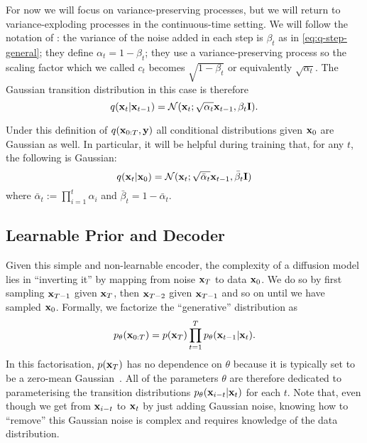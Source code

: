 For now we will focus on variance-preserving processes, but we will return to variance-exploding processes in the continuous-time setting. We will follow the notation of \citet{nichol2021improved}: the variance of the noise added in each step is $\beta_t$ as in \cref{eq:q-step-general}; they define $\alpha_t = 1-\beta_t$; they use a variance-preserving process so the scaling factor which we called $c_t$ becomes $\sqrt{1-\beta_t}$ or equivalently $\sqrt{\alpha_t}$. The Gaussian transition distribution in this case is therefore
\begin{equation} \label{eq:q-step-iddpm}
    q({\mathbf{x}}_t | {\mathbf{x}}_{t-1}) = {\mathcal{N}}({\mathbf{x}}_t ; \sqrt{\alpha_t}  {\mathbf{x}}_{t-1} , \beta_t {\mathbf{I}} ).
\end{equation}

Under this definition of $q({\mathbf{x}}_{0:T}, {\mathbf{y}})$ all conditional distributions given ${\mathbf{x}}_0$ are Gaussian as well. In particular, it will be helpful during training that, for any $t$, the following is Gaussian: 
\begin{equation} \label{eq:q-step-iddpm}
    q({\mathbf{x}}_t | {\mathbf{x}}_0) = {\mathcal{N}}({\mathbf{x}}_t ; \sqrt{\bar{\alpha}_t}  {\mathbf{x}}_{t-1} , \bar{\beta}_t {\mathbf{I}} )
\end{equation}
where $\bar{\alpha}_t := \prod_{i=1}^t \alpha_i$ and $\bar{\beta}_t = 1 - \bar{\alpha}_t$.

\subsection{Learnable Prior and Decoder}
Given this simple and non-learnable encoder, the complexity of a diffusion model lies in ``inverting it'' by mapping from noise ${\mathbf{x}}_T$ to data ${\mathbf{x}}_0$. We do so by first sampling ${\mathbf{x}}_{T-1}$ given ${\mathbf{x}}_T$, then ${\mathbf{x}}_{T-2}$ given ${\mathbf{x}}_{T-1}$ and so on until we have sampled ${\mathbf{x}}_0$. Formally, we factorize the ``generative'' distribution as
\begin{equation}
    p_\theta({\mathbf{x}}_{0:T}) = p({\mathbf{x}}_T) \prod_{t=1}^T p_\theta({\mathbf{x}}_{t-1}|{\mathbf{x}}_t).
\end{equation}
In this factorisation, $p({\mathbf{x}}_T)$ has no dependence on $\theta$ because it is typically set to be a zero-mean Gaussian~\citep{ho2020denoising}. All of the parameters $\theta$ are therefore dedicated to parameterising the transition distributions $p_\theta({\mathbf{x}}_{i-t}|{\mathbf{x}}_t)$ for each $t$. Note that, even though we get from ${\mathbf{x}}_{i-t}$ to ${\mathbf{x}}_t$ by just adding Gaussian noise, knowing how to ``remove'' this Gaussian noise is complex and requires knowledge of the data distribution.

